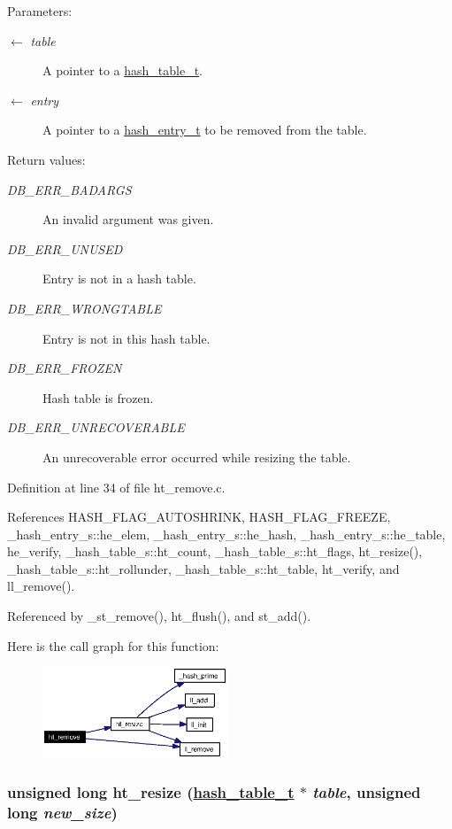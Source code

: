 \begin{Desc}
\item[Parameters:]
\begin{description}
\item[\mbox{$\leftarrow$} {\em table}]A pointer to a \hyperlink{group__dbprim__hash_ga1}{hash\_\-table\_\-t}. \item[\mbox{$\leftarrow$} {\em entry}]A pointer to a \hyperlink{group__dbprim__hash_ga2}{hash\_\-entry\_\-t} to be removed from the table.\end{description}
\end{Desc}
\begin{Desc}
\item[Return values:]
\begin{description}
\item[{\em DB\_\-ERR\_\-BADARGS}]An invalid argument was given. \item[{\em DB\_\-ERR\_\-UNUSED}]Entry is not in a hash table. \item[{\em DB\_\-ERR\_\-WRONGTABLE}]Entry is not in this hash table. \item[{\em DB\_\-ERR\_\-FROZEN}]Hash table is frozen. \item[{\em DB\_\-ERR\_\-UNRECOVERABLE}]An unrecoverable error occurred while resizing the table.\end{description}
\end{Desc}


Definition at line 34 of file ht\_\-remove.c.

References HASH\_\-FLAG\_\-AUTOSHRINK, HASH\_\-FLAG\_\-FREEZE, \_\-hash\_\-entry\_\-s::he\_\-elem, \_\-hash\_\-entry\_\-s::he\_\-hash, \_\-hash\_\-entry\_\-s::he\_\-table, he\_\-verify, \_\-hash\_\-table\_\-s::ht\_\-count, \_\-hash\_\-table\_\-s::ht\_\-flags, ht\_\-resize(), \_\-hash\_\-table\_\-s::ht\_\-rollunder, \_\-hash\_\-table\_\-s::ht\_\-table, ht\_\-verify, and ll\_\-remove().

Referenced by \_\-st\_\-remove(), ht\_\-flush(), and st\_\-add().

Here is the call graph for this function:\begin{figure}[H]
\begin{center}
\leavevmode
\includegraphics[width=157pt]{group__dbprim__hash_ga13_cgraph}
\end{center}
\end{figure}
\hypertarget{group__dbprim__hash_ga17}{
\subsubsection[ht\_\-resize]{\setlength{\rightskip}{0pt plus 5cm}unsigned long ht\_\-resize (\hyperlink{struct__hash__table__s}{hash\_\-table\_\-t} $\ast$ {\em table}, unsigned long {\em new\_\-size})}}
\label{group__dbprim__hash_ga17}


